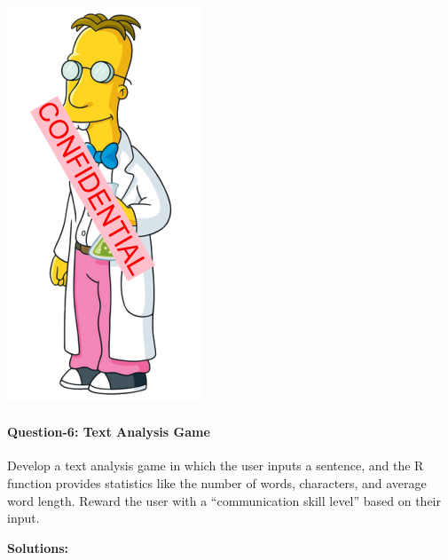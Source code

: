\documentclass[
]{article}
\begin{document}
\includegraphics{Challenge-5_files/figure-latex/unnamed-chunk-5-1.png}

\hypertarget{question-6-text-analysis-game}{%
\paragraph{Question-6: Text Analysis
Game}\label{question-6-text-analysis-game}}

Develop a text analysis game in which the user inputs a sentence, and
the R function provides statistics like the number of words, characters,
and average word length. Reward the user with a ``communication skill
level'' based on their input.

\textbf{Solutions:}
\end{document}
